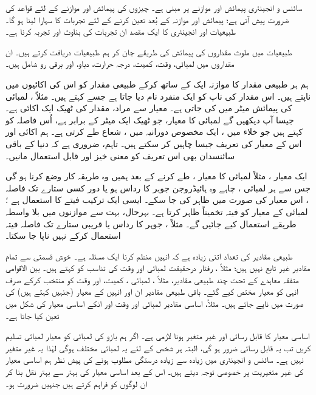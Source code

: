 سائنس و  انجینئری پیمائش اور موازنے  پر مبنی ہے۔ چیزوں کی پیمائش اور موازنے کے  لئے قواعد کی ضرورت پیش آتی ہے؛  پیمائش اور موازنہ کے  بُعد تعین کرنے کے لئے تجربات کا سہارا لینا  ہو گا۔ طبیعیات اور انجینئری کا ایک مقصد ان تجربات کی بناوٹ اور تجربہ کرنا ہے۔

طبیعیات میں ملوث مقداروں کی پیمائش کی طریقے جان کر ہم طبیعیات دریافت کرتے ہیں۔ ان مقداروں میں لمبائی، وقت، کمیت، درجہ حرارت، دباو، اور برقی رو شامل ہیں۔

ہم ہر طبیعی  مقدار کا موازنہ ایک   کے ساتھ کرکے  طبیعی مقدار  کو اس کی اکائیوں  میں ناپتے ہیں۔ اس مقدار کی ناپ کو ایک منفرد نام دیا جاتا ہے جسے   کہتے ہیں۔ مثلاً ، لمبائی کی پیمائش   میٹر  میں  کی جاتی ہے۔ معیار سے مراد،  مقدار کی ٹھیک ایک اکائی ہے۔ جیسا آپ دیکھیں گے لمبائی کا معیار،  جو ٹھیک ایک میٹر کے برابر ہے، اُس فاصلہ کو کہتے ہیں جو خلاء میں  ،  ایک مخصوص دورانیہ میں  ، شعاع طے کرتی  ہے۔ ہم اکائی اور اس کے معیار کی تعریف جیسا چاہیں کر سکتے ہیں۔ تاہم، ضروری ہے کہ دنیا کے باقی سائنسدان بھی اس تعریف کو معنی خیز اور قابل استعمال  مانیں۔

ایک معیار ، مثلاً لمبائی کا معیار ،  طے کرنے کے بعد ہمیں وہ طریقہ کار وضع  کرنا  ہو گی جس سے   ہر  لمبائی ، چاہے وہ ہائیڈروجن جوہر کا رداس ہو یا دور  کسی ستارے تک فاصلہ ، اس معیار کی صورت میں ظاہر کی جا سکے۔ ایسی ایک ترکیب فیتے کا استعمال ہے ؛  لمبائی کے معیار کو  فیتہ تخمیناً ظاہر کرتا ہے۔ بہرحال، بہت سے  موازنوں میں بلا واسطہ طریقے استعمال کیے  جائیں گے۔ مثلاً ،  جوہر کا رداس یا قریبی ستارے تک فاصلہ فیتہ استعمال کرکے نہیں ناپا جا سکتا۔

 طبیعی مقادیر کی تعداد اتنی زیادہ ہے  کہ انہیں منظم کرنا  ایک  مسئلہ ہے۔  خوش قسمتی سے تمام  مقادیر غیر تابع نہیں ہیں؛ مثلاً ، رفتار درحقیقت لمبائی اور وقت کی  تناسب کو کہتے ہیں۔  بین الاقوامی متفقہ  معاہدے کے تحت چند طبیعی مقادیر،  مثلاً ،  لمبائی ،  کمیت، اور وقت  کو منتخب کرکے صرف انہی کو معیار مختص کیے گئے۔   باقی  طبیعی مقادیر ان  اور  انہیں کے  معیار (جنہیں   کہتے ہیں) کی صورت میں ناپے جاتے ہیں۔ مثلاً،  اساسی مقادیر  لمبائی اور وقت اور انکے اساسی معیار کی  شکل میں  تعین کیا جاتا ہے۔ 

اساسی معیار  کا قابل رسائی اور    غیر متغیر  ہونا  لازمی ہے۔ اگر ہم بازو کی لمبائی کو معیار لمبائی تسلیم  کریں تب یہ قابل رسائی ضرور ہو گی، البتہ ہر شخص کے لئے یہ لمبائی مختلف ہوگی لہٰذا یہ غیر  متغیر نہیں ہے۔ سائنس و  انجینئری میں زیادہ سے زیادہ درستگی مطلوب ہونے کی  پیش نظر ہم اساسی  معیار کی   غیر متغیریت  پر  خصوصی توجہ  دیتے  ہیں۔  اس کے بعد اساسی معیار کی بہتر سے بہتر نقل بنا کر    ان لوگوں کو  فراہم  کرتے ہیں جنہیں ضرورت ہو۔


